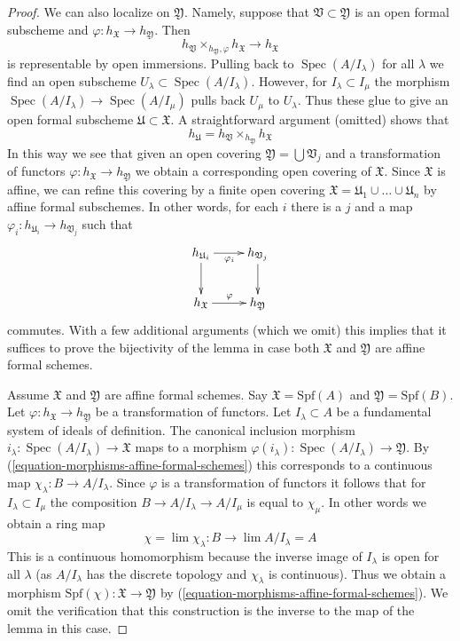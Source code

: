 \documentclass{stacks-project}
\theoremstyle{plain}
\theoremstyle{definition}
\theoremstyle{remark}
\numberwithin{equation}{subsection}
\def\lim{\mathop{\mathrm{lim}}\nolimits}
\def\Spec{\mathop{\mathrm{Spec}}}
\begin{document}
\begin{proof}
\medskip\noindent
We can also localize on $\mathfrak Y$.
Namely, suppose that $\mathfrak V \subset \mathfrak Y$ is an
open formal subscheme and $\varphi : h_\mathfrak X \to h_\mathfrak Y$.
Then
$$
h_\mathfrak V \times_{h_\mathfrak Y, \varphi} h_\mathfrak X \to h_\mathfrak X
$$
is representable by open immersions. Pulling back to
$\Spec(A/I_\lambda)$ for all $\lambda$ we find an open subscheme
$U_\lambda \subset \Spec(A/I_\lambda)$. However, for
$I_\lambda \subset I_\mu$ the morphism $\Spec(A/I_\lambda) \to \Spec(A/I_\mu)$
pulls back $U_\mu$ to $U_\lambda$. Thus these glue to give
an open formal subscheme $\mathfrak U \subset \mathfrak X$.
A straightforward argument (omitted) shows that
$$
h_\mathfrak U = h_\mathfrak V \times_{h_\mathfrak Y} h_\mathfrak X
$$
In this way we see that given an open covering
$\mathfrak Y = \bigcup \mathfrak V_j$ and a transformation
of functors $\varphi :  h_\mathfrak X \to h_\mathfrak Y$
we obtain a corresponding open covering of $\mathfrak X$.
Since $\mathfrak X$ is affine, we can refine this covering by
a finite open covering
$\mathfrak X = \mathfrak U_1 \cup \ldots \cup \mathfrak U_n$
by affine formal subschemes. In other words, for each $i$ there
is a $j$ and a map $\varphi_i : h_{\mathfrak U_i} \to h_{\mathfrak V_j}$
such that
$$
\xymatrix{
h_{\mathfrak U_i} \ar[r]_{\varphi_i} \ar[d] & h_{\mathfrak V_j} \ar[d] \\
h_{\mathfrak X} \ar[r]^\varphi & h_\mathfrak Y
}
$$
commutes. With a few additional arguments (which we omit) this implies
that it suffices to prove the bijectivity of the lemma in case
both $\mathfrak X$ and $\mathfrak Y$ are affine formal schemes.

\medskip\noindent
Assume $\mathfrak X$ and $\mathfrak Y$ are affine formal schemes.
Say $\mathfrak X = \text{Spf}(A)$ and $\mathfrak Y = \text{Spf}(B)$.
Let $\varphi : h_\mathfrak X \to h_\mathfrak Y$ be a transformation
of functors. Let $I_\lambda \subset A$ be a fundamental system of
ideals of definition. The canonical inclusion morphism
$i_\lambda : \Spec(A/I_\lambda) \to \mathfrak X$ maps to a morphism
$\varphi(i_\lambda) : \Spec(A/I_\lambda) \to \mathfrak Y$.
By (\ref{equation-morphisms-affine-formal-schemes}) this corresponds
to a continuous map $\chi_\lambda : B \to A/I_\lambda$.
Since $\varphi$ is a transformation of functors it follows
that for $I_\lambda \subset I_\mu$ the composition
$B \to A/I_\lambda \to A/I_\mu$ is equal to $\chi_\mu$.
In other words we obtain a ring map
$$
\chi = \lim \chi_\lambda : B \longrightarrow \lim A/I_\lambda = A
$$
This is a continuous homomorphism because the inverse image
of $I_\lambda$ is open for all $\lambda$ (as $A/I_\lambda$ has the discrete
topology and $\chi_\lambda$ is continuous). Thus we obtain
a morphism $\text{Spf}(\chi) : \mathfrak X \to \mathfrak Y$ by
(\ref{equation-morphisms-affine-formal-schemes}).
We omit the verification that this construction is the inverse
to the map of the lemma in this case.


\end{proof}
\end{document}
